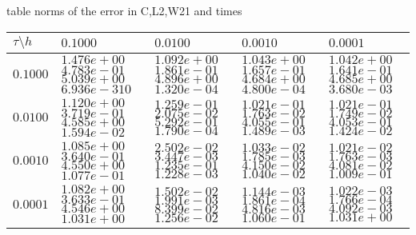 

\begin{center}
table norms of the error in C,L2,W21 and times
\\[2.0ex]  
  
\begin{tabular}{|p{0.7in}|p{0.7in}|p{0.7in}|p{0.7in}|p{0.7in}|} \hline
$\tau\setminus h$ & $0.1000$& $0.0100$& $0.0010$& $0.0001$\\ \hline

$0.1000$ & $1.476e+00$ $4.783e-01$ $5.039e+00$ $6.936e-310$ &$1.092e+00$ $1.861e-01$ $4.896e+00$ $1.320e-04$ &$1.043e+00$ $1.657e-01$ $4.684e+00$ $4.800e-04$ &$1.042e+00$ $1.641e-01$ $4.685e+00$ $3.680e-03$  \\ \hline
$0.0100$ & $1.120e+00$ $3.719e-01$ $4.585e+00$ $1.594e-02$ &$1.259e-01$ $2.075e-02$ $5.292e-01$ $1.790e-04$ &$1.021e-01$ $1.763e-02$ $4.055e-01$ $1.489e-03$ &$1.021e-01$ $1.749e-02$ $4.053e-01$ $1.424e-02$  \\ \hline
$0.0010$ & $1.085e+00$ $3.640e-01$ $4.550e+00$ $1.077e-01$ &$2.502e-02$ $3.447e-03$ $1.235e-01$ $1.228e-03$ &$1.033e-02$ $1.785e-03$ $4.150e-02$ $1.040e-02$ &$1.021e-02$ $1.763e-03$ $4.081e-02$ $1.009e-01$  \\ \hline
$0.0001$ & $1.082e+00$ $3.633e-01$ $4.546e+00$ $1.031e+00$ &$1.502e-02$ $1.991e-03$ $8.399e-02$ $1.256e-02$ &$1.144e-03$ $1.861e-04$ $4.816e-03$ $1.060e-01$ &$1.022e-03$ $1.766e-04$ $4.092e-03$ $1.031e+00$  \\ \hline
\end{tabular}\\[20pt]
\end{center}

